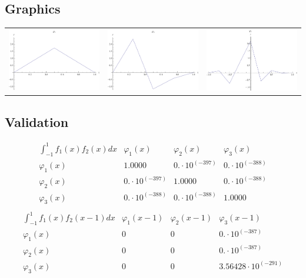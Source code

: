 \documentclass{article}
\begin{document}
\begin{landscape}
\subsection{Graphics}
\begin{tabular}{ccc}
\includegraphics[width=6.7cm]{linear_bspline_1.pdf}& \includegraphics[width=6.7cm]{linear_bspline_2.pdf}& \includegraphics[width=6.7cm]{linear_bspline_3.pdf} \\
\end{tabular} 
 \end{landscape}
 \begin{landscape}
 \subsection{Validation}$$ \begin{array}{l|lll}
\int_{-1}^1 f_1(x)f_2(x) dx& \varphi_1(x)& \varphi_2(x)& \varphi_3(x) \\ \hline 
 \varphi_1(x) & 1.0000 & 0.\cdot 10^{(-397)} & 0.\cdot 10^{(-388)} \\ 
\varphi_2(x) & 0.\cdot 10^{(-397)} & 1.0000 & 0.\cdot 10^{(-388)} \\ 
\varphi_3(x) & 0.\cdot 10^{(-388)} & 0.\cdot 10^{(-388)} & 1.0000 \\ 
\end{array} $$
$$ \begin{array}{l|lll}
\int_{-1}^1 f_1(x)f_2(x-1) dx& \varphi_1(x-1)& \varphi_2(x-1)& \varphi_3(x-1) \\ \hline 
 \varphi_1(x) & 0 & 0 & 0.\cdot 10^{(-387)} \\ 
\varphi_2(x) & 0 & 0 & 0.\cdot 10^{(-387)} \\ 
\varphi_3(x) & 0 & 0 & 3.56428\cdot 10^{(-291)} \\ 
\end{array} $$ 
\end{landscape} 
\end{document}
